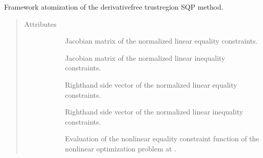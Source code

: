 \documentclass[letterpaper,10pt,english]{sphinxmanual}
\begin{document}
\begin{fulllineitems}
\label{\detokenize{refs/generated/cobyqa.optimize.TrustRegion:cobyqa.optimize.TrustRegion}}
\sphinxAtStartPar
Framework atomization of the derivative\sphinxhyphen{}free trust\sphinxhyphen{}region SQP method.
\begin{quote}\begin{description}
\item[{Attributes}] \leavevmode\begin{description}
\item[{}] \leavevmode
\sphinxAtStartPar
Jacobian matrix of the normalized linear equality constraints.

\item[{}] \leavevmode
\sphinxAtStartPar
Jacobian matrix of the normalized linear inequality constraints.

\item[{}] \leavevmode
\sphinxAtStartPar
Right\sphinxhyphen{}hand side vector of the normalized linear equality constraints.

\item[{}] \leavevmode
\sphinxAtStartPar
Right\sphinxhyphen{}hand side vector of the normalized linear inequality constraints.

\item[{}] \leavevmode
\sphinxAtStartPar
Evaluation of the nonlinear equality constraint function of the nonlinear optimization problem at .


\end{description}
\end{description}
\end{quote}
\end{fulllineitems}
\end{document}
